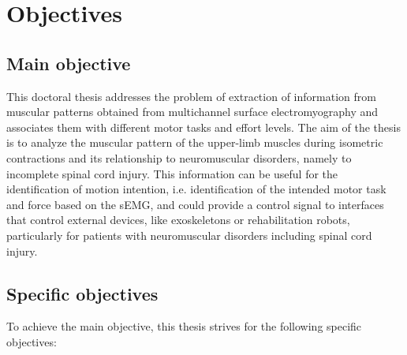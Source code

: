      \section{Objectives}
     
     	\subsection*{Main objective}

This doctoral thesis addresses the problem of extraction of information from muscular patterns obtained from multichannel surface electromyography and associates them with different motor tasks and effort levels. The aim of the thesis is to analyze the muscular pattern of the upper-limb muscles during isometric contractions and its relationship to neuromuscular disorders, namely to incomplete spinal cord injury. This information can be useful for the identification of motion intention, i.e. identification of the intended motor task and force based on the sEMG, and could provide a control signal to interfaces that control external devices, like exoskeletons or rehabilitation robots, particularly for patients with neuromuscular disorders including spinal cord injury.

      
        \subsection*{Specific objectives}
        
To achieve the main objective, this thesis strives for the following specific objectives:


